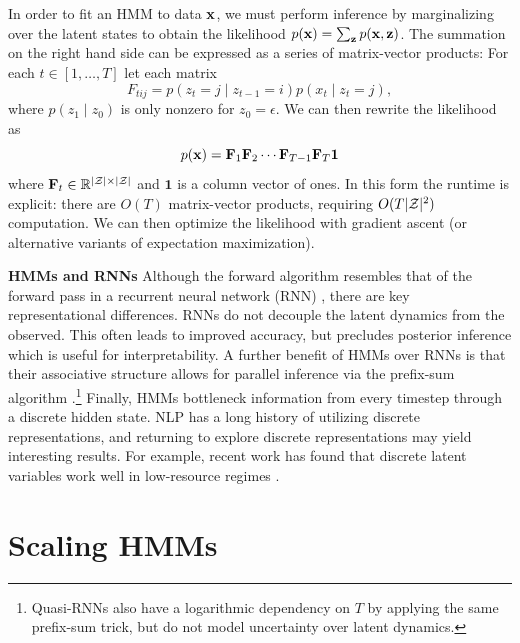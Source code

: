 \documentclass[11pt,a4paper]{article}
\begin{document}
In order to fit an HMM to data $\mathbf{x}$,
we must perform inference by marginalizing over the latent states to obtain the likelihood
$p(\mathbf{x}) = \sum_{\mathbf{z}}p(\mathbf{x},\mathbf{z})$.
The summation on the right hand side can be expressed as a series of matrix-vector products:
For each $t \in [1, \ldots, T]$ let each matrix
\begin{equation}
\label{eqn:factors}
F_{tij} = p(z_t = j \mid z_{t-1} = i) p(x_t \mid z_t = j),
\end{equation}
where $p(z_1 \mid z_0)$ is only nonzero for $z_0 = \epsilon$.
We can then rewrite the likelihood as
\begin{equation}
\label{eqn:mat_ev}
p(\mathbf{x}) = \mathbf{F}_1 \mathbf{F}_2 \cdots \mathbf{F}_{T-1}\mathbf{F}_{T}\mathbf{1}
\end{equation}
where $\mathbf{F}_t\in\mathbb{R}^{|\mathcal{Z}|\times|\mathcal{Z}|}$ and $\mathbf{1}$ is a column vector of ones.
In this form the runtime is explicit: there are $O(T)$ matrix-vector products,
requiring $O(T |\mathcal{Z}|^2)$ computation.
We can then optimize the likelihood 
with gradient ascent (or alternative variants of expectation maximization).

\noindent \textbf{HMMs and RNNs}
Although the forward algorithm resembles that of the forward pass in a recurrent neural network (RNN)
\citep{buys2018hmm}, there are key representational differences.
RNNs do not decouple the latent dynamics from the observed.
This often leads to improved accuracy,
but precludes posterior inference which is useful for interpretability.
A further benefit of HMMs over RNNs is that
their associative structure allows for parallel inference
via the prefix-sum algorithm \cite{ladner1980prefix}.\footnote{
Quasi-RNNs \citep{bradbury2016qrnn} also have a logarithmic dependency on $T$
by applying the same prefix-sum trick, but do not model uncertainty over
latent dynamics.}
Finally, HMMs bottleneck information from every timestep through a discrete hidden state. 
NLP has a long history of utilizing discrete representations,
and returning to explore discrete representations may yield interesting results.
For example, recent work has found that discrete latent variables
work well in low-resource regimes \citep{jin2020discrete}.


\section{Scaling HMMs}
\label{sec:methods}
\end{document}
